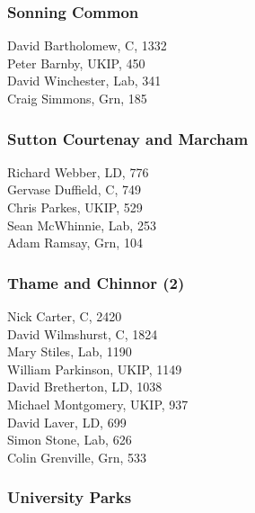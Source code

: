 \documentclass[a4paper,openany,10pt]{book}
\begin{document}
\subsubsection*{Sonning Common}



David Bartholomew, C, 1332\\
Peter Barnby, UKIP, 450\\
David Winchester, Lab, 341\\
Craig Simmons, Grn, 185\\


\subsubsection*{Sutton Courtenay and Marcham}



Richard Webber, LD, 776\\
Gervase Duffield, C, 749\\
Chris Parkes, UKIP, 529\\
Sean McWhinnie, Lab, 253\\
Adam Ramsay, Grn, 104\\


\subsubsection*{Thame and Chinnor (2)}



Nick Carter, C, 2420\\
David Wilmshurst, C, 1824\\
Mary Stiles, Lab, 1190\\
William Parkinson, UKIP, 1149\\
David Bretherton, LD, 1038\\
Michael Montgomery, UKIP, 937\\
David Laver, LD, 699\\
Simon Stone, Lab, 626\\
Colin Grenville, Grn, 533\\


\subsubsection*{University Parks}
\end{document}
